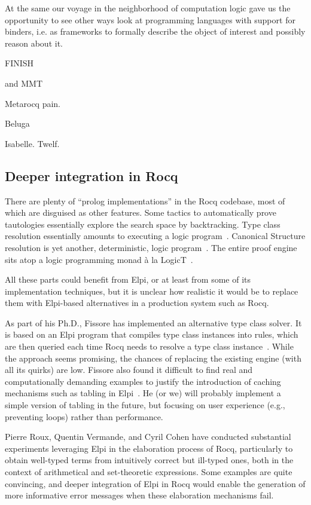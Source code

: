 \documentclass[a4paper, 11pt]{book}
\begin{document}
At the same our voyage in the neighborhood of computation logic
gave us the opportunity to see other ways look at programming
languages with support for binders, i.e. as frameworks to formally
describe the object of interest and possibly reason about it.

FINISH

 and
MMT~\cite{RABE20131}


Metarocq pain.

Beluga\cite{DBLP:conf/cade/PientkaC15,10.1007/978-3-642-12251-4_1}

Isabelle.
 Twelf.


\subsection{Deeper integration in Rocq}

There are plenty of ``prolog implementations'' in the Rocq codebase, most of
which are disguised as other features. Some tactics to automatically prove
tautologies essentially explore the search space by backtracking. Type class
resolution essentially amounts to executing a logic program~\cite{fctc}.
Canonical Structure resolution is yet another, deterministic, logic
program~\cite{tassi13}. The entire proof engine sits atop a logic programming
monad à la LogicT~\cite{logicT}.

All these parts could benefit from Elpi, or at least from some of its
implementation techniques, but it is unclear how realistic it would be to
replace them with Elpi-based alternatives in a production system such as Rocq.

As part of his Ph.D., Fissore has implemented an alternative type class solver.
It is based on an Elpi program that compiles type class instances into rules,
which are then queried each time Rocq needs to resolve a type class
instance~\cite{newtc,unifforfree}. While the approach seems promising, the
chances of replacing the existing engine (with all its quirks) are low. Fissore
also found it difficult to find real and computationally demanding examples to
justify the introduction of caching mechanisms such as tabling in
Elpi~\cite{selsam2020tabledtypeclassresolution,brigittePHD}. He (or we) will
probably implement a simple version of tabling in the future, but focusing on
user experience (e.g., preventing loops) rather than performance.

Pierre Roux, Quentin Vermande, and Cyril Cohen have conducted substantial
experiments leveraging Elpi in the elaboration process of Rocq, particularly to
obtain well-typed terms from intuitively correct but ill-typed ones, both in
the context of arithmetical and set-theoretic expressions. Some examples are
quite convincing, and deeper integration of Elpi in Rocq would enable the
generation of more informative error messages when these elaboration mechanisms
fail.
\end{document}
